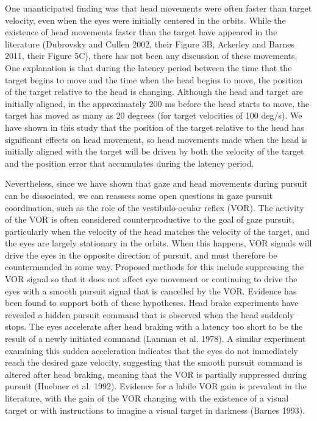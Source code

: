 \documentclass[12pt]{article}
\begin{document}
One unanticipated finding was that head movements were often faster than target velocity, even when the eyes were initially centered in the orbits. While the existence of head movements faster than the target have appeared in the literature (Dubrovsky and Cullen 2002, their Figure 3B, Ackerley and Barnes 2011, their Figure 5C), there has not been any discussion of these movements.  One explanation is that during the latency period between the time that the target begins to move and the time when the head begins to move, the position of the target relative to the head is changing. Although the head and target are initially aligned, in the approximately 200 ms before the head starts to move, the target has moved as many as 20 degrees (for target velocities of 100 deg/s). We have shown in this study that the position of the target relative to the head has significant effects on head movement, so head movements made when the head is initially aligned with the target will be driven by both the velocity of the target and the position error that accumulates during the latency period. 

Nevertheless, since we have shown that gaze and head movements during pursuit can be dissociated, we can reassess some open questions in gaze pursuit coordination, such as the role of the vestibulo-ocular reflex (VOR). The activity of the VOR is often considered counterproductive to the goal of gaze pursuit, particularly when the velocity of the head matches the velocity of the target, and the eyes are largely stationary in the orbits. When this happens, VOR signals will drive the eyes in the opposite direction of pursuit, and must therefore be countermanded in some way. Proposed methods for this include suppressing the VOR signal so that it does not affect eye movement or continuing to drive the eyes with a smooth pursuit signal that is cancelled by the VOR. Evidence has been found to support both of these hypotheses. Head brake experiments have revealed a hidden pursuit command that is observed when the head suddenly stops. The eyes accelerate after head braking with a latency too short to be the result of a newly initiated command (Lanman et al. 1978). A similar experiment examining this sudden acceleration indicates that the eyes do not immediately reach the desired gaze velocity, suggesting that the smooth pursuit command is altered after head braking, meaning that the VOR is partially suppressed during pursuit (Huebner et al. 1992). Evidence for a labile VOR gain is prevalent in the literature, with the gain of the VOR changing with the existence of a visual target or with instructions to imagine a visual target in darkness (Barnes 1993). 
\end{document}

